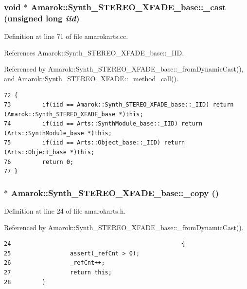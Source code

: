 \subsubsection{\setlength{\rightskip}{0pt plus 5cm}void $\ast$ Amarok::Synth\_\-STEREO\_\-XFADE\_\-base::\_\-cast (unsigned long {\em iid})\hspace{0.3cm}{\tt  [inherited]}}\label{classAmarok_1_1Synth__STEREO__XFADE__base_Amarok_1_1Synth__STEREO__XFADE__stuba6}




Definition at line 71 of file amarokarts.cc.

References Amarok::Synth\_\-STEREO\_\-XFADE\_\-base::\_\-IID.

Referenced by Amarok::Synth\_\-STEREO\_\-XFADE\_\-base::\_\-from\-Dynamic\-Cast(), and Amarok::Synth\_\-STEREO\_\-XFADE::\_\-method\_\-call().



\footnotesize\begin{verbatim}72 {
73         if(iid == Amarok::Synth_STEREO_XFADE_base::_IID) return (Amarok::Synth_STEREO_XFADE_base *)this;
74         if(iid == Arts::SynthModule_base::_IID) return (Arts::SynthModule_base *)this;
75         if(iid == Arts::Object_base::_IID) return (Arts::Object_base *)this;
76         return 0;
77 }
\end{verbatim}\normalsize 
{}
\subsubsection{$\ast$ Amarok::Synth\_\-STEREO\_\-XFADE\_\-base::\_\-copy ()\hspace{0.3cm}{\tt  [inline, inherited]}}\label{classAmarok_1_1Synth__STEREO__XFADE__base_Amarok_1_1Synth__STEREO__XFADE__stuba3}




Definition at line 24 of file amarokarts.h.

Referenced by Amarok::Synth\_\-STEREO\_\-XFADE\_\-base::\_\-from\-Dynamic\-Cast().



\footnotesize\begin{verbatim}24                                                 {
25                 assert(_refCnt > 0);
26                 _refCnt++;
27                 return this;
28         }
\end{verbatim}\normalsize 
{}
